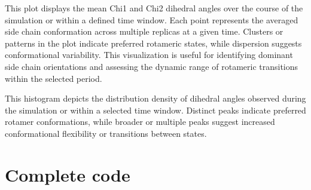 \documentclass[a4paper,10pt,english]{sphinxmanual}
\let\sphinxpxdimen\pdfpxdimen\else\newdimen\sphinxpxdimen
\begin{document}
\noindent{\hspace*{\fill}\sphinxincludegraphics[width=600\sphinxpxdimen]{{dotplot}.png}\hspace*{\fill}}

\sphinxAtStartPar
{} This plot displays the mean Chi1 and Chi2 dihedral angles over the course of the simulation or within a defined time window. Each point represents the averaged side chain conformation across multiple replicas at a given time. Clusters or patterns in the plot indicate preferred rotameric states, while dispersion suggests conformational variability. This visualization is useful for identifying dominant side chain orientations and assessing the dynamic range of rotameric transitions within the selected period.

\noindent{\hspace*{\fill}\sphinxincludegraphics[width=600\sphinxpxdimen]{{histogram}.png}\hspace*{\fill}}

\sphinxAtStartPar
{} This histogram depicts the distribution density of dihedral angles observed during the simulation or within a selected time window. Distinct peaks indicate preferred rotamer conformations, while broader or multiple peaks suggest increased conformational flexibility or transitions between states.


\section{Complete code}
\label{\detokenize{Rotamers:complete-code}}
\begin{sphinxVerbatim}[commandchars=\\\{\}]
 
\end{sphinxVerbatim}

\begin{sphinxVerbatim}[commandchars=\\\{\}]
\end{sphinxVerbatim}
\end{document}
